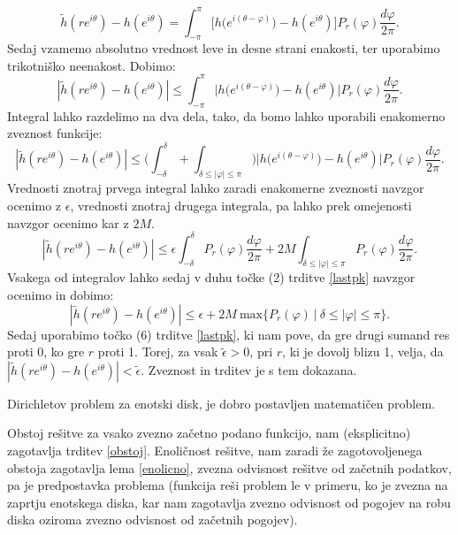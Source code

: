 \documentclass[mat1]{fmfdelo}
\begin{document}
\begin{dokaz}
        $$
            \widetilde{h}(re^{i\theta}) - h(e^{i\theta}) = \int_{-\pi}^{\pi}{\bigg[h\big(e^{i(\theta - \varphi)}\big) - h(e^{i\theta})\bigg]P_r(\varphi)\frac{d\varphi}{2\pi}}.
        $$
        Sedaj vzamemo absolutno vrednost leve in desne strani enakosti, ter uporabimo trikotniško neenakost. Dobimo:
        $$
        |\widetilde{h}(re^{i\theta}) - h(e^{i\theta})| \leq \int_{-\pi}^{\pi}{\bigg| h\big(e^{i(\theta - \varphi)}\big) - h(e^{i\theta})\bigg|P_r(\varphi)\frac{d\varphi}{2\pi}}.
        $$
        Integral lahko razdelimo na dva dela, tako, da bomo lahko uporabili enakomerno zveznost funkcije:
        $$
        |\widetilde{h}(re^{i\theta}) - h(e^{i\theta})| \leq \bigg(\int_{-\delta}^{\delta} + \int_{\delta \leq |\varphi| \le \pi}\bigg){\bigg| h\big(e^{i(\theta - \varphi)}\big) - h(e^{i\theta})\bigg|P_r(\varphi)\frac{d\varphi}{2\pi}}.
        $$
        Vrednosti znotraj prvega integral lahko zaradi enakomerne zveznosti navzgor ocenimo z $\epsilon$, vrednosti znotraj drugega integrala, pa lahko prek omejenosti navzgor ocenimo kar z $2M$. 
        $$
        |\widetilde{h}(re^{i\theta}) - h(e^{i\theta})| \leq \epsilon \int_{-\delta}^{\delta}{P_r(\varphi) \frac{d\varphi}{2\pi}} + 2M\int_{\delta \leq |\varphi| \leq \pi}{P_r(\varphi)\frac{d\varphi}{2\pi}}.
        $$
        Vsakega od integralov lahko sedaj v duhu točke (2) trditve \ref{lastpk} navzgor ocenimo in dobimo:
        $$
        |\widetilde{h}(re^{i\theta}) - h(e^{i\theta})| \leq \epsilon  + 2M~\text{max}\{P_r(\varphi)~| ~\delta \leq |\varphi| \leq \pi \}.
        $$
        Sedaj uporabimo točko (6) trditve \ref{lastpk}, ki nam pove, da gre drugi sumand res proti 0, ko gre $r$ proti 1. 
        Torej, za vsak $\widetilde{\epsilon} > 0$, pri $r$, ki je dovolj blizu 1, velja, da $|\widetilde{h}(re^{i\theta}) - h(e^{i\theta})| < \widetilde{\epsilon}$.
        Zveznost in trditev je s tem dokazana.
    \end{dokaz}
    \begin{posledica}
        Dirichletov problem za enotski disk, je dobro postavljen matematičen problem. 
    \end{posledica}
    \begin{dokaz}
        Obstoj rešitve za vsako zvezno začetno podano funkcijo, nam (eksplicitno) zagotavlja trditev \ref{obstoj}. 
        Enoličnost rešitve, nam zaradi že zagotovoljenega obstoja zagotavlja lema \ref{enolicno}, zvezna odvisnost rešitve od začetnih podatkov, pa je predpostavka problema (funkcija reši problem le v primeru, ko je zvezna na zaprtju enotskega diska, kar nam zagotavlja zvezno odvisnost od pogojev na robu diska oziroma zvezno odvisnost od začetnih pogojev).
    \end{dokaz}
\end{document}
